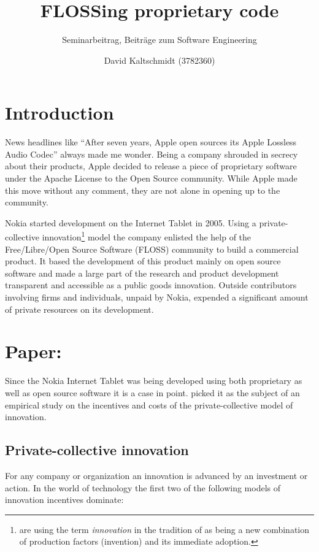 \documentclass[a4paper]{scrartcl}
\title{FLOSSing proprietary code}
\subtitle{Seminarbeitrag, Beiträge zum Software Engineering}
\author{David Kaltschmidt (3782360)}
\begin{document}
\maketitle

\section{Introduction}

News headlines like ``After seven years, Apple open sources its Apple Lossless Audio Codec''\cite{ars201110alac} always made me wonder.
Being a company shrouded in secrecy about their products, Apple decided to release a piece of proprietary software under the Apache License to the Open Source community. 
While Apple made this move without any comment, they are not alone in opening up to the community.

Nokia started development on the Internet Tablet in 2005. 
Using a private-collective innovation\footnote{\citeauthor{stuermer2009extending} are using the term \emph{innovation} in the tradition of \textcite[Ch 3.B, p. 83]{schumpeter1939business} as being a new combination of production factors (invention) and its immediate adoption.} model the company enlisted the help of the Free/Libre/Open Source Software (FLOSS) community to build a commercial product. 
It based the development of this product mainly on open source software and made a large part of the research and product development transparent and accessible as a public goods innovation.
Outside contributors involving firms and individuals, unpaid by Nokia, expended a significant
amount of private resources on its development.

\section{Paper: }

Since the Nokia Internet Tablet was being developed using both proprietary as well as open source software it is a case in point. 
\citeauthor{stuermer2009extending} picked it as the subject of an empirical study on the incentives and costs of the private-collective model of innovation.

\subsection{Private-collective innovation}

For any company or organization an innovation is advanced by an investment or action.
In the world of technology the first two of the following models of innovation incentives dominate:
\end{document}
